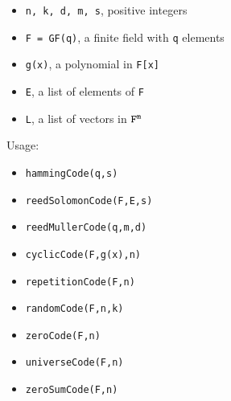 \documentclass[12pt]{amsart}
\theoremstyle{plain}
\begin{document}
\begin{minipage}[t]{0.53\textwidth}
\begin{itemize}[leftmargin=0.55 cm]
  \item {\tt n, k, d, m, s}, positive integers
  \item {\tt F = GF(q)}, a finite field with {\tt q} elements
  \item {\tt g(x)}, a polynomial in {\tt F[x]}
 \end{itemize}
\end{minipage}
\begin{minipage}[t]{0.45\textwidth}
 \begin{itemize}[leftmargin=0.55 cm]
  \item {\tt E}, a list of elements of {\tt F}
  \item {\tt L}, a list of vectors in ${\tt F}^{\mathtt{m}}$
 \end{itemize}
\end{minipage}

\medskip

Usage:

\medskip

\begin{minipage}[t]{0.35\textwidth}
\begin{itemize}[leftmargin=0.55 cm]
\item {\tt hammingCode(q,s)}
\item {\tt reedSolomonCode(F,E,s)}
\item {\tt reedMullerCode(q,m,d)}
\end{itemize}
\end{minipage}
\begin{minipage}[t]{0.33\textwidth}
\begin{itemize}[leftmargin=0.55 cm]
\item {\tt cyclicCode(F,g(x),n)}
\item {\tt repetitionCode(F,n)}
\item {\tt randomCode(F,n,k)}
\end{itemize}
\end{minipage}
\begin{minipage}[t]{0.3\textwidth}
\begin{itemize}[leftmargin=0.55 cm]
\item {\tt zeroCode(F,n)}
\item {\tt universeCode(F,n)}
\item {\tt zeroSumCode(F,n)}
\end{itemize}
\end{minipage}
\end{document}
